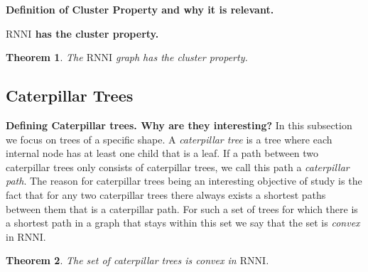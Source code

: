 \documentclass[11pt]{amsart}
\newtheorem{theorem}{Theorem}
\newcommand{\rnni}{\mathrm{RNNI}}
\newcommand{\summary}[1]{\textbf{#1}} %
\begin{document}
\summary{Definition of Cluster Property and why it is relevant.}

\summary{$\rnni$ has the cluster property.}
\begin{theorem}
	The $\rnni$ graph has the cluster property.
	\label{thm:cluster_property_rnni}
\end{theorem}

\subsection{Caterpillar Trees}

\summary{Defining Caterpillar trees. Why are they interesting?}
In this subsection we focus on trees of a specific shape.
A \emph{caterpillar tree} is a tree where each internal node has at least one child that is a leaf.
If a path between two caterpillar trees only consists of caterpillar trees, we call this path a \emph{caterpillar path}.
The reason for caterpillar trees being an interesting objective of study is the fact that for any two caterpillar trees there always exists a shortest paths between them that is a caterpillar path.
For such a set of trees for which there is a shortest path in a graph that stays within this set we say that the set is \emph{convex} in $\rnni$.

\begin{theorem}
	The set of caterpillar trees is convex in $\rnni$.
	\label{thm:caterpillar_convex_rnni}
\end{theorem}
\end{document}
